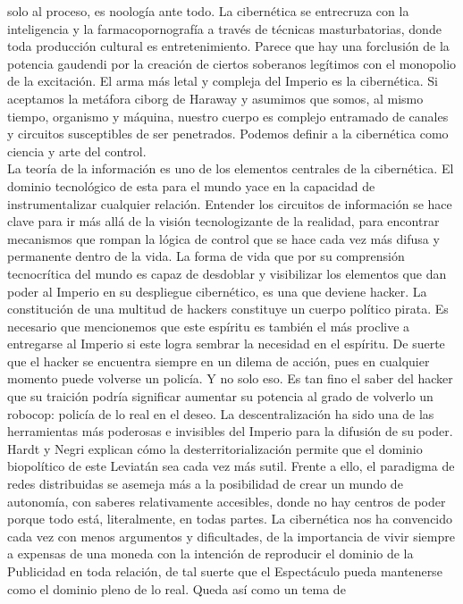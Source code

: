 \documentclass[
]{article}
\begin{document}
solo al proceso, es noología ante todo. La cibernética se entrecruza con
la inteligencia y la farmacopornografía a través de técnicas
masturbatorias, donde toda producción cultural es entretenimiento.
Parece que hay una forclusión de la potencia gaudendi por la creación de
ciertos soberanos legítimos con el monopolio de la excitación. El arma
más letal y compleja del Imperio es la cibernética. Si aceptamos la
metáfora ciborg de Haraway y asumimos que somos, al mismo tiempo,
organismo y máquina, nuestro cuerpo es complejo entramado de canales y
circuitos susceptibles de ser penetrados. Podemos definir a la
cibernética como ciencia y arte del control.\\
La teoría de la información es uno de los elementos centrales de la
cibernética. El dominio tecnológico de esta para el mundo yace en la
capacidad de instrumentalizar cualquier relación. Entender los circuitos
de información se hace clave para ir más allá de la visión
tecnologizante de la realidad, para encontrar mecanismos que rompan la
lógica de control que se hace cada vez más difusa y permanente dentro de
la vida. La forma de vida que por su comprensión tecnocrítica del mundo
es capaz de desdoblar y visibilizar los elementos que dan poder al
Imperio en su despliegue cibernético, es una que deviene hacker. La
constitución de una multitud de hackers constituye un cuerpo político
pirata. Es necesario que mencionemos que este espíritu es también el más
proclive a entregarse al Imperio si este logra sembrar la necesidad en
el espíritu. De suerte que el hacker se encuentra siempre en un dilema
de acción, pues en cualquier momento puede volverse un policía. Y no
solo eso. Es tan fino el saber del hacker que su traición podría
significar aumentar su potencia al grado de volverlo un robocop: policía
de lo real en el deseo. La descentralización ha sido una de las
herramientas más poderosas e invisibles del Imperio para la difusión de
su poder. Hardt y Negri explican cómo la desterritorialización permite
que el dominio biopolítico de este Leviatán sea cada vez más sutil.
Frente a ello, el paradigma de redes distribuidas se asemeja más a la
posibilidad de crear un mundo de autonomía, con saberes relativamente
accesibles, donde no hay centros de poder porque todo está,
literalmente, en todas partes. La cibernética nos ha convencido cada vez
con menos argumentos y dificultades, de la importancia de vivir siempre
a expensas de una moneda con la intención de reproducir el dominio de la
Publicidad en toda relación, de tal suerte que el Espectáculo pueda
mantenerse como el dominio pleno de lo real. Queda así como un tema de
\end{document}
